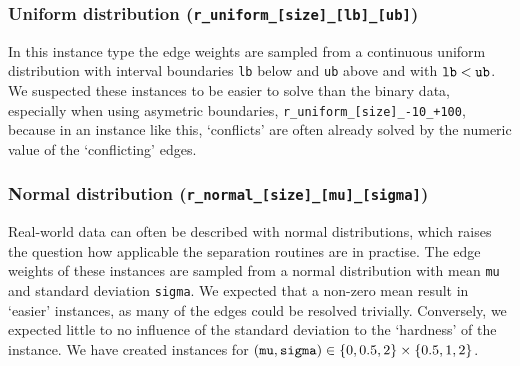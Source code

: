 \subsubsection{Uniform distribution (\texttt{r\_uniform\_[size]\_[lb]\_[ub]})}\label{subsubsec:data_random_uniform}
In this instance type the edge weights are sampled from a continuous uniform distribution with interval boundaries \texttt{lb} below and \texttt{ub} above and with $\text{\texttt{lb}} < \text{\texttt{ub}}$.
We suspected these instances to be easier to solve than the binary data, especially when using asymetric boundaries, \eg \texttt{r\_uniform\_[size]\_-10\_+100}, because in an instance like this, ‘conflicts’ are often already solved by the numeric value of the ‘conflicting’ edges.

\subsubsection{Normal distribution (\texttt{r\_normal\_[size]\_[mu]\_[sigma]})}\label{subsubsec:data_random_normal}
Real-world data can often be described with normal distributions, which raises the question how applicable the separation routines are in practise.
The edge weights of these instances are sampled from a normal distribution with mean \texttt{mu} and standard deviation \texttt{sigma}.
We expected that a non-zero mean result in ‘easier’ instances, as many of the edges could be resolved trivially.
Conversely, we expected little to no influence of the standard deviation to the ‘hardness’ of the instance.
We have created instances for $(\text{\texttt{mu}}, \text{\texttt{sigma}}) \in \left\{ 0, 0.5, 2 \right\} \times \left\{ 0.5, 1, 2 \right\}$.
